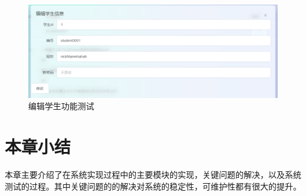 \begin{figure}[H]
  \centering
  \includegraphics[scale = 0.6]{out/figure/测试/manage-edit-student-test.png}
  \caption{\song\wuhao 编辑学生功能测试}
  \label{manage-edit-student-test}
\end{figure}

\section{本章小结}

本章主要介绍了在系统实现过程中的主要模块的实现，关键问题的解决，以及系统测试的过程。其中关键问题的的解决对系统的稳定性，可维护性都有很大的提升。